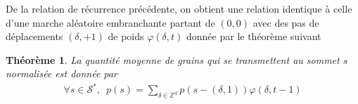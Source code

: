 \documentclass{article}
\newtheorem{theorem}{Théorème}[section]
\theoremstyle{definition}
\begin{document}


De la relation de récurrence précédente, on obtient une relation identique à celle d'une marche aléatoire embranchante partant de $(0,0)$ avec des pas de déplacements $(\delta, +1)$ de poids $\varphi(\delta, t)$ donnée par le théorème suivant
\begin{theorem}
	La quantité moyenne de grains qui se transmettent au sommet $s$ normalisée est donnée par
	\begin{align*}
	\forall s\in\mathcal{S}^*,\,\,\, p(s) = \sum_{\delta\in \mathbb{Z}^d}p(s-(\delta,1))\varphi(\delta,t-1)\end{align*} 
		


\end{theorem}
\end{document}
